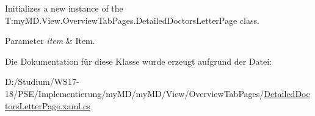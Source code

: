 Initializes a new instance of the T\+:my\+M\+D.\+View.\+Overview\+Tab\+Pages.\+Detailed\+Doctors\+Letter\+Page class. 


\begin{DoxyParams}{Parameter}
{\em item} & Item.\\
\hline
\end{DoxyParams}


Die Dokumentation für diese Klasse wurde erzeugt aufgrund der Datei\+:\begin{DoxyCompactItemize}
\item 
D\+:/\+Studium/\+W\+S17-\/18/\+P\+S\+E/\+Implementierung/my\+M\+D/my\+M\+D/\+View/\+Overview\+Tab\+Pages/\mbox{\hyperlink{_detailed_doctors_letter_page_8xaml_8cs}{Detailed\+Doctors\+Letter\+Page.\+xaml.\+cs}}\end{DoxyCompactItemize}
